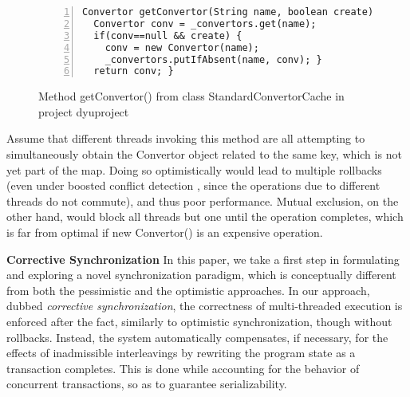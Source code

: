 
\begin{figure}
	\begin{lstlisting}[numbers=left]
Convertor getConvertor(String name, boolean create) {
  Convertor conv = _convertors.get(name);
  if(conv==null && create) {
    conv = new Convertor(name);
    _convertors.putIfAbsent(name, conv); }
  return conv; }
	\end{lstlisting}
	\caption{\label{Fi:introMotivating}Method {\sf getConvertor()} from class {\sf StandardConvertorCache} in project {\sf dyuproject}}
\end{figure}

Assume that different threads invoking this method are all attempting to simultaneously obtain the {\sf Convertor} object related to the same key, which is not yet part of the map. Doing so optimistically would lead to multiple rollbacks (even under boosted conflict detection \cite{ppopp08}, since the operations due to different threads do not commute), and thus poor performance. Mutual exclusion, on the other hand, would block all threads but one until the operation completes, which is far from optimal if {\sf new Convertor()} is an expensive operation.

\noindent \textbf{Corrective Synchronization} In this paper, we take a first step in formulating and exploring a novel synchronization paradigm, which is conceptually different from both the pessimistic and the optimistic approaches. In our approach, dubbed \emph{corrective synchronization}, the correctness of multi-threaded execution is enforced after the fact, similarly to optimistic synchronization, though without rollbacks. Instead, the system automatically compensates, if necessary, for the effects of inadmissible interleavings by rewriting the program state as a transaction completes. This is done while accounting for the behavior of concurrent transactions, so as to guarantee serializability.

